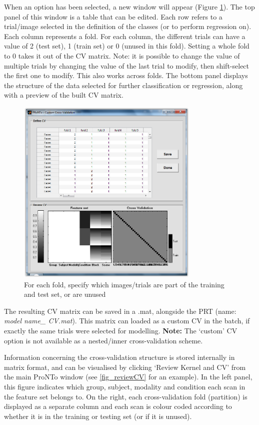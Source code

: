 When an option has been selected, a new window will appear (Figure \ref{fig_customCV}). The top panel of this window is a table that can be edited. Each row refers to a trial/image selected in the definition of the classes (or to perform regression on). Each column represents a fold. For each column, the different trials can have a value of 2 (test set), 1 (train set) or 0 (unused in this fold). Setting a whole fold to 0 takes it out of the CV matrix. Note: it is possible to change the value of multiple trials by changing the value of the last trial to modify, then shift-select the first one to modify. This also works across folds. The bottom panel displays the structure of the data selected for further classification or regression, along with a preview of the built CV matrix.

\begin{figure}[!h]
\begin{center}
\includegraphics[height=9cm]{images/prt_customCV.PNG}
\caption{For each fold, specify which images/trials are part of the training and test set, or are unused}
 \label{fig_customCV}
\end{center}
\end{figure}

The resulting CV matrix can be saved in a .mat, alongside the PRT (name: \textit{model name\_ CV.mat}). This matrix can loaded as a custom CV in the batch, if exactly the same trials were selected for modelling. \textbf{Note:} The `custom' CV option is not available as a nested/inner cross-validation scheme. 

Information concerning the cross-validation structure is stored internally in matrix format, and can be visualised by clicking `Review Kernel and CV' from the main ProNTo window (see \ref{fig_reviewCV} for an example). In the left panel, this figure indicates which group, subject, modality and condition each scan in the feature set belongs to. On the right, each cross-validation fold (partition) is displayed as a separate column and each scan is colour coded according to whether it is in the training or testing set (or if it is unused).


